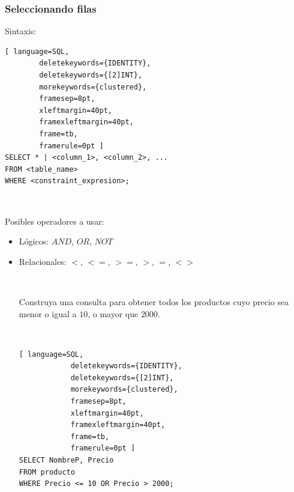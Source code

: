 \documentclass[
	10pt, %
	aspectratio=169, %
]{beamer}
\begin{document}
\begin{frame}[fragile]
	
	\frametitle{Seleccionando filas}
	
	Sintaxis:
	\begin{lstlisting}[ language=SQL,
		deletekeywords={IDENTITY},
		deletekeywords={[2]INT},
		morekeywords={clustered},
		framesep=8pt,
		xleftmargin=40pt,
		framexleftmargin=40pt,
		frame=tb,
		framerule=0pt ]
SELECT * | <column_1>, <column_2>, ...
FROM <table_name>
WHERE <constraint_expresion>;
\end{lstlisting}

	\ 
	
	\pause 
	
	Posibles operadores a usar: 
	\begin{itemize}
	
		\item Lógicos: $AND$, $OR$, $NOT$
		
		\item Relacionales: $<$, $<=$, $>=$, $>$, $=$, $<>$
		
		
		\pause
		
		\ 
		
		Construya una consulta para obtener todos los productos cuyo precio sea menor o igual a $10$, o mayor que $2000$.
		
		\pause
		
		\ 
			\begin{lstlisting}[ language=SQL,
			deletekeywords={IDENTITY},
			deletekeywords={[2]INT},
			morekeywords={clustered},
			framesep=8pt,
			xleftmargin=40pt,
			framexleftmargin=40pt,
			frame=tb,
			framerule=0pt ]
SELECT NombreP, Precio
FROM producto
WHERE Precio <= 10 OR Precio > 2000; 
\end{lstlisting}
		
	\end{itemize}
	
\end{frame}

\end{document}
